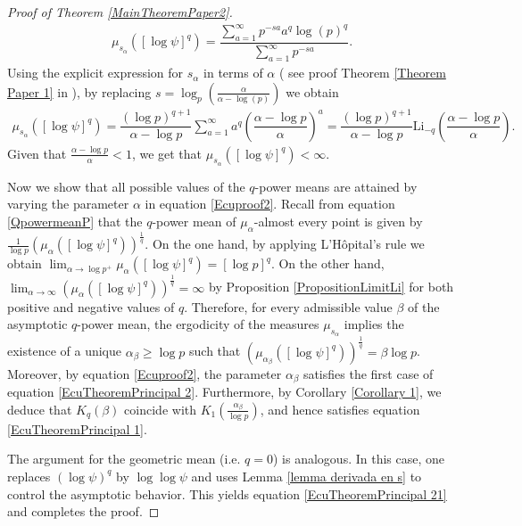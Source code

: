 \documentclass[11pt]{amsart}
\theoremstyle{remark}
\numberwithin{equation}{section}
\newcommand{\Li}{\mathrm{Li}}
\begin{document}
\begin{proof}[Proof of Theorem \ref{MainTheoremPaper2}]
    \begin{align*}
        \mu_{s_{\alpha}}([\log\psi]^{q})= \dfrac{\sum^{\infty}_{a=1}p^{-sa}a^{q}\log(p)^{q}}{\sum^{\infty}_{a=1}p^{-sa}}.
    \end{align*}Using the explicit expression for $s_{\alpha}$ in terms of $\alpha$ ( see proof Theorem \ref{Theorem Paper 1} in \cite{paper1}), by replacing $s=\log_{p}(\frac{\alpha}{\alpha-\log(p)})$ we obtain
    \begin{align}\label{Ecuproof2}
        \mu_{s_{\alpha}}([\log\psi]^{q})=\dfrac{(\log p)^{q+1}}{\alpha-\log p}\sum^{\infty}_{a=1}a^{q}\left(\dfrac{\alpha-\log p}{\alpha}\right)^{a}=\dfrac{(\log p)^{q+1}}{\alpha-\log p}\Li_{-q}\left(\dfrac{\alpha-\log p}{\alpha}\right).
    \end{align} Given that $\frac{\alpha-\log p}{\alpha}< 1$, we get that $\mu_{s_{\alpha}}([\log\psi]^{q})<\infty$. 
    
     Now we show that all possible values of the $q$-power means are attained by varying the parameter $\alpha$ in equation \eqref{Ecuproof2}. Recall from equation \eqref{QpowermeanP} that the $q$-power mean of $\mu_{\alpha}$-almost every point is given by $\frac{1}{\log p}(\mu_{\alpha}([\log\psi]^{q}))^{\frac{1}{q}}$. On the one hand, by applying L'H\^opital's rule we obtain $\lim_{\alpha\to \log p^{+}}\mu_{\alpha}([\log\psi]^{q})=[\log p]^{q}$. On the other hand, $\lim_{\alpha\to \infty}(\mu_{\alpha}([\log\psi]^{q}))^{\frac{1}{q}}=\infty$ by Proposition \ref{PropositionLimitLi} for both positive and negative values of $q$. Therefore, for every admissible value $\beta$ of the asymptotic $q$-power mean, the ergodicity of the measures $\mu_{s_{\alpha}}$ implies the existence of a unique $\alpha_{\beta} \geq \log p$ such that $(\mu_{\alpha_{\beta}}([\log\psi]^{q}))^{\frac{1}{q}}=\beta\log p$. Moreover, by equation \eqref{Ecuproof2}, the parameter $\alpha_{\beta}$ satisfies the first case of equation \eqref{EcuTheoremPrincipal 2}.
     Furthermore, by Corollary \ref{Corollary 1}, we deduce that $K_{q}(\beta)$ coincide with $K_1(\frac{\alpha_{\beta}}{\log p})$, and hence satisfies equation \eqref{EcuTheoremPrincipal 1}.
        
     The argument for the geometric mean (i.e. $q=0$) is analogous. In this case, one replaces $(\log \psi)^q$ by $\log \log \psi$ and uses Lemma \ref{lemma derivada en s} to control the asymptotic behavior.  This yields equation \eqref{EcuTheoremPrincipal 21} and completes the proof.
\end{proof}
\end{document}
